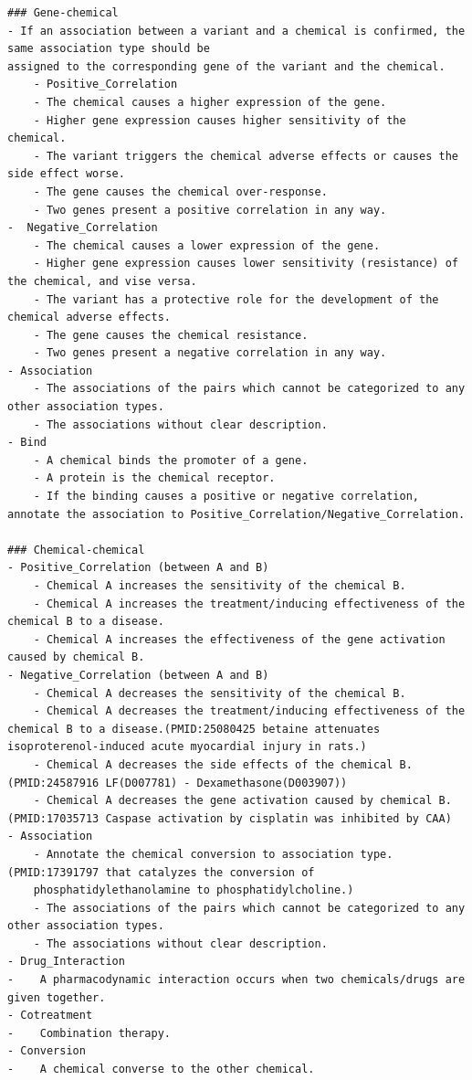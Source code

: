 \begin{lstlisting}
### Gene-chemical
- If an association between a variant and a chemical is confirmed, the same association type should be
assigned to the corresponding gene of the variant and the chemical.
    - Positive_Correlation
    - The chemical causes a higher expression of the gene.
    - Higher gene expression causes higher sensitivity of the chemical.
    - The variant triggers the chemical adverse effects or causes the side effect worse.
    - The gene causes the chemical over-response.
    - Two genes present a positive correlation in any way.
-  Negative_Correlation
    - The chemical causes a lower expression of the gene.
    - Higher gene expression causes lower sensitivity (resistance) of the chemical, and vise versa.
    - The variant has a protective role for the development of the chemical adverse effects.
    - The gene causes the chemical resistance.
    - Two genes present a negative correlation in any way.
- Association
    - The associations of the pairs which cannot be categorized to any other association types.
    - The associations without clear description.
- Bind
    - A chemical binds the promoter of a gene.
    - A protein is the chemical receptor.
    - If the binding causes a positive or negative correlation, annotate the association to Positive_Correlation/Negative_Correlation.

### Chemical-chemical
- Positive_Correlation (between A and B)
    - Chemical A increases the sensitivity of the chemical B.
    - Chemical A increases the treatment/inducing effectiveness of the chemical B to a disease.
    - Chemical A increases the effectiveness of the gene activation caused by chemical B.
- Negative_Correlation (between A and B)
    - Chemical A decreases the sensitivity of the chemical B.
    - Chemical A decreases the treatment/inducing effectiveness of the chemical B to a disease.(PMID:25080425 betaine attenuates isoproterenol-induced acute myocardial injury in rats.)
    - Chemical A decreases the side effects of the chemical B. (PMID:24587916 LF(D007781) - Dexamethasone(D003907))
    - Chemical A decreases the gene activation caused by chemical B. (PMID:17035713 Caspase activation by cisplatin was inhibited by CAA)
- Association
    - Annotate the chemical conversion to association type. (PMID:17391797 that catalyzes the conversion of
    phosphatidylethanolamine to phosphatidylcholine.)
    - The associations of the pairs which cannot be categorized to any other association types.
    - The associations without clear description.
- Drug_Interaction
-    A pharmacodynamic interaction occurs when two chemicals/drugs are given together.
- Cotreatment
-    Combination therapy.
- Conversion
-    A chemical converse to the other chemical.


\end{lstlisting}
